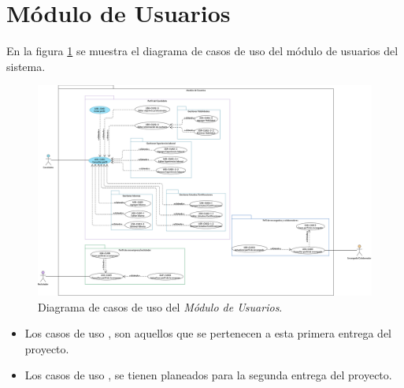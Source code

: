 	
	

	
	

	
	

\section{Módulo de Usuarios}
	En la figura \ref{adcu:usr} se muestra el diagrama de casos de uso del módulo de usuarios del sistema.

	\begin{figure}[hbtp!]
		\begin{center}
			\includegraphics[width=1 \textwidth]{anexos/imagenes/CUUSR.png}
		\end{center}
		
		\caption{Diagrama de casos de uso del \textit{Módulo de Usuarios}.}
		\label{adcu:usr}
	\end{figure}

	\begin{itemize}
        \item Los casos de uso \IUazul{} , son aquellos que se pertenecen a esta primera entrega del proyecto.
        \item Los casos de uso \IUblanco{}, se tienen planeados para la segunda entrega del proyecto.
    \end{itemize} 

	
	

	
	
	

